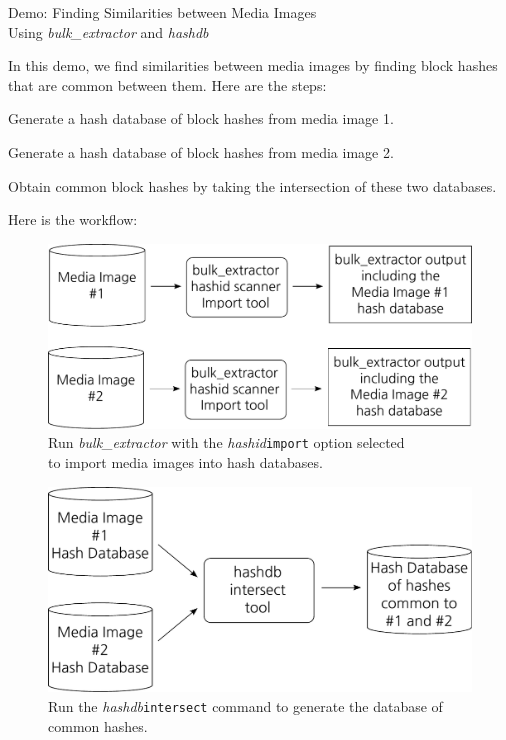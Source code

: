 \documentclass[12pt,twoside]{article}
\newcommand{\hdb}{\emph{hashdb}\xspace}
\newcommand{\bulk}{\emph{bulk\_extractor}\xspace}
\newcommand{\hashid}{\emph{hashid}\xspace}
\begin{document}
\begin{center}
\Large Demo: Finding Similarities between Media Images \\
\large Using \bulk and \hdb
\end{center}

In this demo, we find similarities between media images
by finding block hashes that are common between them.
Here are the steps:
\begin{compactenum}
\item Generate a hash database of block hashes from media image 1.
\item Generate a hash database of block hashes from media image 2.
\item Obtain common block hashes
by taking the intersection of these two databases.
\end{compactenum}
Here is the workflow:
\begin{figure}[H]
  \center
  \includegraphics[scale=0.6]{drawings/import_hashes}
  \caption*{Run \bulk with the \hashid \texttt{import} option selected \\
            to import media images into hash databases.}
\end{figure}

\begin{figure}[H]
  \center
  \includegraphics[scale=0.6]{drawings/intersect_hashes}
  \caption*{Run the \hdb \texttt{intersect} command
            to generate the database of common hashes.}
\end{figure}
\end{document}
